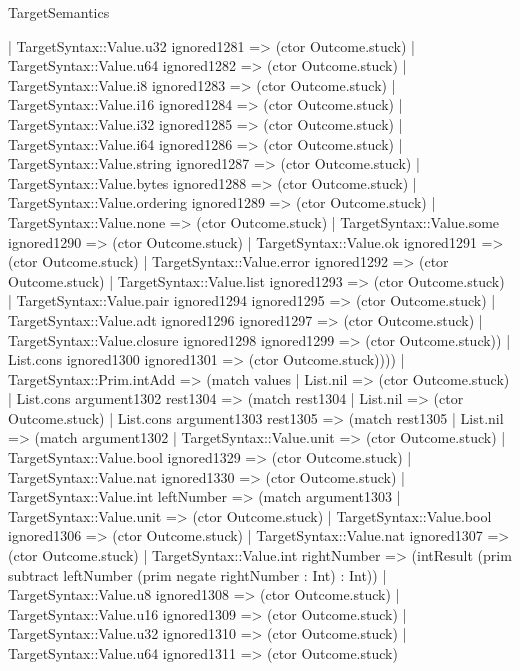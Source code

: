 \begin{lexlean}{TargetSemantics}
\begin{semanticmodule}
{            | TargetSyntax::Value.u32 ignored1281 => (ctor Outcome.stuck)
            | TargetSyntax::Value.u64 ignored1282 => (ctor Outcome.stuck)
            | TargetSyntax::Value.i8 ignored1283 => (ctor Outcome.stuck)
            | TargetSyntax::Value.i16 ignored1284 => (ctor Outcome.stuck)
            | TargetSyntax::Value.i32 ignored1285 => (ctor Outcome.stuck)
            | TargetSyntax::Value.i64 ignored1286 => (ctor Outcome.stuck)
            | TargetSyntax::Value.string ignored1287 => (ctor Outcome.stuck)
            | TargetSyntax::Value.bytes ignored1288 => (ctor Outcome.stuck)
            | TargetSyntax::Value.ordering ignored1289 => (ctor Outcome.stuck)
            | TargetSyntax::Value.none => (ctor Outcome.stuck)
            | TargetSyntax::Value.some ignored1290 => (ctor Outcome.stuck)
            | TargetSyntax::Value.ok ignored1291 => (ctor Outcome.stuck)
            | TargetSyntax::Value.error ignored1292 => (ctor Outcome.stuck)
            | TargetSyntax::Value.list ignored1293 => (ctor Outcome.stuck)
            | TargetSyntax::Value.pair ignored1294 ignored1295 => (ctor Outcome.stuck)
            | TargetSyntax::Value.adt ignored1296 ignored1297 => (ctor Outcome.stuck)
            | TargetSyntax::Value.closure ignored1298 ignored1299 => (ctor Outcome.stuck))
          | List.cons ignored1300 ignored1301 => (ctor Outcome.stuck))))
    | TargetSyntax::Prim.intAdd => (match values
      | List.nil => (ctor Outcome.stuck)
      | List.cons argument1302 rest1304 => (match rest1304
        | List.nil => (ctor Outcome.stuck)
        | List.cons argument1303 rest1305 => (match rest1305
          | List.nil => (match argument1302
            | TargetSyntax::Value.unit => (ctor Outcome.stuck)
            | TargetSyntax::Value.bool ignored1329 => (ctor Outcome.stuck)
            | TargetSyntax::Value.nat ignored1330 => (ctor Outcome.stuck)
            | TargetSyntax::Value.int leftNumber => (match argument1303
              | TargetSyntax::Value.unit => (ctor Outcome.stuck)
              | TargetSyntax::Value.bool ignored1306 => (ctor Outcome.stuck)
              | TargetSyntax::Value.nat ignored1307 => (ctor Outcome.stuck)
              | TargetSyntax::Value.int rightNumber => (intResult (prim subtract leftNumber (prim negate rightNumber : Int) : Int))
              | TargetSyntax::Value.u8 ignored1308 => (ctor Outcome.stuck)
              | TargetSyntax::Value.u16 ignored1309 => (ctor Outcome.stuck)
              | TargetSyntax::Value.u32 ignored1310 => (ctor Outcome.stuck)
              | TargetSyntax::Value.u64 ignored1311 => (ctor Outcome.stuck)
}
\end{semanticmodule}
\end{lexlean}
